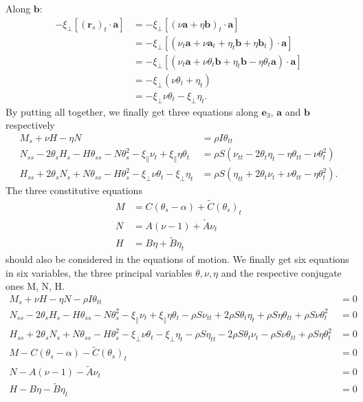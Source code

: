 \documentclass{article}
\begin{document}
Along $\mathbf{b}$:
\begin{equation}
\begin{split}
-\xi_{\perp}\left[(\mathbf{r}_s)_t\cdot\mathbf{a}\right] &= -\xi_{\perp}\left[(\nu\mathbf{a} + \eta\mathbf{b})_t\cdot\mathbf{a}\right]\\
&= -\xi_{\perp}\left[(\nu_t\mathbf{a} +\nu\mathbf{a}_t + \eta_t\mathbf{b} + \eta\mathbf{b}_t)\cdot\mathbf{a}\right]\\
&= -\xi_{\perp}\left[(\nu_t\mathbf{a} +\nu\theta_t\mathbf{b} + \eta_t\mathbf{b} - \eta\theta_t\mathbf{a})\cdot\mathbf{a}\right]\\
&= -\xi_{\perp}(\nu\theta_t + \eta_t)\\
&= -\xi_{\perp}\nu\theta_t - \xi_{\perp}\eta_t.
\end{split}
\end{equation}
By putting all together, we finally get three equations along $\mathbf{e}_3$, $\mathbf{a}$ and $\mathbf{b}$ respectively
\begin{align}
M_s + \nu H -\eta N 
&= \rho I \theta_{tt}\\
N_{ss} - 2\theta_sH_s - H\theta_{ss}- N\theta_s^2 
- \xi_{\parallel}\nu_t + \xi_{\parallel}\eta\theta_t
&= \rho S (\nu_{tt} - 2 \theta_t\eta_t - \eta\theta_{tt} - \nu\theta_t^2)\\
H_{ss} + 2\theta_sN_s + N\theta_{ss} - H\theta_s^2 
- \xi_{\perp}\nu\theta_t - \xi_{\perp}\eta_t
&= \rho S (\eta_{tt} + 2\theta_t\nu_t + \nu\theta_{tt} - \eta\theta_t^2).
\end{align}
The three constitutive equations 
\begin{align}
M &= C(\theta_s -\alpha) + \tilde{C}(\theta_s)_t\\
N &= A(\nu - 1) + \tilde{A}\nu_t\\
H &= B\eta + \tilde{B}\eta_t
\end{align}
should also be considered in the equations of motion. We finally get six equations in six variables, the three principal variables $\theta,\nu,\eta$ and the respective conjugate ones M, N, H.
\begin{align}
M_s + \nu H -\eta N - \rho I \theta_{tt}
&= 0\\
N_{ss} - 2\theta_sH_s - H\theta_{ss}- N\theta_s^2
- \xi_{\parallel}\nu_t + \xi_{\parallel}\eta\theta_t - \rho S \nu_{tt} + 2\rho S \theta_t\eta_t + \rho S \eta\theta_{tt} + \rho S \nu\theta_t^2
&= 0\\
H_{ss} + 2\theta_sN_s + N\theta_{ss} - H\theta_s^2  - \xi_{\perp}\nu\theta_t - \xi_{\perp}\eta_t
 - \rho S \eta_{tt} - 2\rho S \theta_t\nu_t -\rho S \nu\theta_{tt} + \rho S \eta\theta_t^2
&= 0\\
M - C(\theta_s -\alpha) - \tilde{C}(\theta_s)_t &= 0\\
N - A(\nu - 1) - \tilde{A}\nu_t &= 0\\
H - B\eta - \tilde{B}\eta_t &= 0
\end{align}
\end{document}
